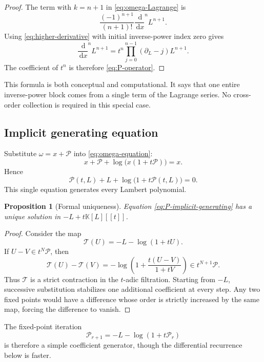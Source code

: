 \documentclass[11pt]{article}
\theoremstyle{pltheorem}
\newtheorem{proposition}[theorem]{Proposition}
\newcommand{\K}{\mathbb K}
\newcommand{\PL}{\mathscr P}
\newcommand{\dd}{\,\mathrm d}
\newcommand{\D}{\frac{\dd}{\dd x}}
\begin{document}
\begin{proof}
The term with \(k=n+1\) in \cref{eq:omega-Lagrange} is
\[
 \frac{(-1)^{n+1}}{(n+1)!}\D^nL^{n+1}.
\]
Using \cref{eq:higher-derivative} with initial inverse-power index zero gives
\[
 \D^nL^{n+1}
 =t^n\prod_{j=0}^{n-1}(\partial_L-j)L^{n+1}.
\]
The coefficient of \(t^n\) is therefore \cref{eq:P-operator}.
\end{proof}

This formula is both conceptual and computational.  It says that one entire inverse-power block comes from a single term of the Lagrange series.  No cross-order collection is required in this special case.

\subsection{Implicit generating equation}

Substitute \(\omega=x+\mathcal P\) into \cref{eq:omega-equation}:
\[
 x+\mathcal P+\log\bigl(x(1+t\mathcal P)\bigr)=x.
\]
Hence
\begin{equation}\label{eq:P-implicit-generating}
 \boxed{\quad
 \mathcal P(t,L)+L+\log\bigl(1+t\mathcal P(t,L)\bigr)=0.
 \quad}
\end{equation}
This single equation generates every Lambert polynomial.

\begin{proposition}[Formal uniqueness]\label{prop:P-unique}
Equation \cref{eq:P-implicit-generating} has a unique solution in
\(-L+t\K[L][[t]]\).
\end{proposition}

\begin{proof}
Consider the map
\[
 \mathcal T(U)=-L-\log(1+tU).
\]
If \(U-V\in t^N\PL\), then
\[
 \mathcal T(U)-\mathcal T(V)
 =-\log\left(1+\frac{t(U-V)}{1+tV}\right)
 \in t^{N+1}\PL.
\]
Thus \(\mathcal T\) is a strict contraction in the \(t\)-adic filtration.  Starting from \(-L\), successive substitution stabilizes one additional coefficient at every step.  Any two fixed points would have a difference whose order is strictly increased by the same map, forcing the difference to vanish.
\end{proof}

The fixed-point iteration
\begin{equation}\label{eq:P-fixed-iteration}
 \mathcal P_{r+1}=-L-\log(1+t\mathcal P_r)
\end{equation}
is therefore a simple coefficient generator, though the differential recurrence below is faster.
\end{document}
